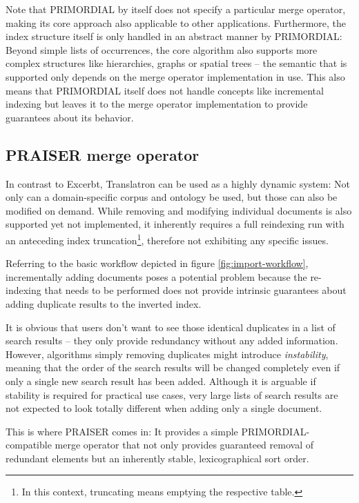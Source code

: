 \documentclass[a4paper, 12pt, twoside, reqn]{report}
\numberwithin{figure}{chapter}
\newtheorem[L]{boxedDefinition}{Definition}
\newtheorem[L]{boxedExample}{Example}
\begin{document}
Note that PRIMORDIAL by itself does not specify a particular merge operator, making its core approach also applicable to other applications. Furthermore, the index structure itself is only handled in an abstract manner by PRIMORDIAL: Beyond simple lists of occurrences, the core algorithm also supports more complex structures like hierarchies, graphs or spatial trees -- the semantic that is supported only depends on the merge operator implementation in use. This also means that PRIMORDIAL itself does not handle concepts like incremental indexing but leaves it to the merge operator implementation to provide guarantees about its behavior.

\clearpage


\subsection{PRAISER merge operator}\label{sec:praiser}

In contrast to Excerbt, Translatron can be used as a highly dynamic system: Not only can a domain-specific corpus and ontology be used, but those can also be modified on demand. While removing and modifying individual documents is also supported yet not implemented, it inherently requires a full reindexing run with an anteceding index truncation\footnote{In this context, truncating means emptying the respective table.}, therefore not exhibiting any specific issues.

Referring to the basic workflow depicted in figure \vref{fig:import-workflow}, incrementally adding documents poses a potential problem because the re-indexing that needs to be performed does not provide intrinsic guarantees about adding duplicate results to the inverted index.

It is obvious that users don't want to see those identical duplicates in a list of search results -- they only provide redundancy without any added information. However, algorithms simply removing duplicates might introduce \textit{instability}, meaning that the order of the search results will be changed completely even if only a single new search result has been added. Although it is arguable if stability is required for practical use cases, very large lists of search results are not expected to look totally different when adding only a single document.

This is where PRAISER comes in: It provides a simple PRIMORDIAL-compatible merge operator that not only provides guaranteed removal of redundant elements but an inherently stable, lexicographical sort order.
\end{document}
